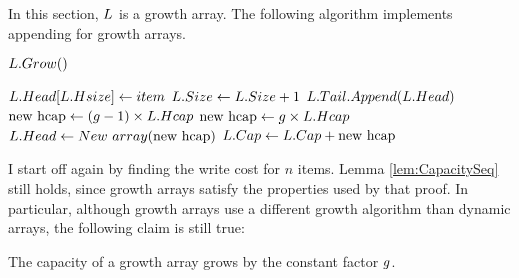 \HdrGrowthArrayImpl

In this section, $L$ is a growth array. The following algorithm implements appending for growth arrays.

\begin{algorithm}
	\begin{algorithmic}[1]
		\State $L.Grow()$
		\EndIf
		
		\State $L.Head[L.Hsize] \gets item$
		\State $L.Size \gets L.Size + 1$
		\EndProcedure
		\Statex
		\State $L.Tail.Append(L.Head)$
			\State $\text{new hcap} \gets (g - 1) \times L.Hcap$
		\Else
			\State $\text{new hcap} \gets g \times L.Hcap$
		\EndIf
		\State $L.Head \gets New\ array(\text{new hcap})$
		\State $L.Cap \gets L.Cap + \text{new hcap}$
		\EndProcedure
	\end{algorithmic}
\end{algorithm}

\HdrTimeComplex

I start off again by finding the write cost for $n$ items. Lemma \ref{lem:CapacitySeq} still holds, since growth arrays satisfy the properties used by that proof. In particular, although growth arrays use a different growth algorithm than dynamic arrays, the following claim is still true:

\begin{lemma}
\label{lem:GrowthArraysGrowthFactor}
	The capacity of a growth array grows by the constant factor $g$.
\end{lemma}

